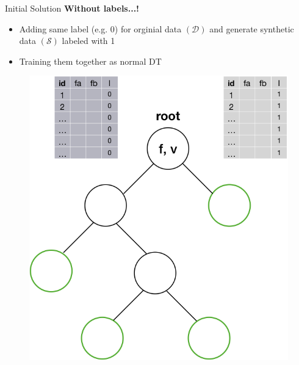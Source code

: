 \documentclass[shortpres]{beamer}
\begin{document}
  \begin{frame}{Initial Solution}	
    \textbf{Without labels...!} 
    \begin{itemize} 
      \item Adding same label (e.g. 0) for orginial data $(\mathcal{D})$ and generate synthetic data $(\mathcal{S})$ labeled with 1
      \item Training them together as normal DT
    \end{itemize}
      \begin{figure}
        \includegraphics[height=0.5\textheight]{fig/dtwithout3.png} 
      \end{figure}
      \end{frame}
\end{document}
